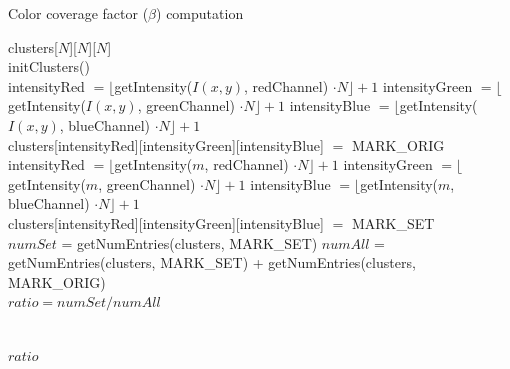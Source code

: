 \begin{algorithm}[bt]
\caption{Color coverage factor ($\beta$) computation}
\label{alg:ccfc}
\begin{algorithmic}[0]

\State clusters[$N$][$N$][$N$]
\\
\State initClusters()
\\
				\State intensityRed $= \lfloor$getIntensity($I(x,y)$, redChannel) $\cdot N\rfloor + 1$
				\State intensityGreen $= \lfloor$getIntensity($I(x,y)$, greenChannel) $\cdot N\rfloor + 1$
				\State intensityBlue $= \lfloor$getIntensity($I(x,y)$, blueChannel) $\cdot N\rfloor + 1$
				\\
				\State clusters[intensityRed][intensityGreen][intensityBlue] $=$ MARK\_ORIG
		\EndFor
\EndFor
\\
\For {$\omega \in \Omega$}
				\State intensityRed $= \lfloor$getIntensity($m$, redChannel) $\cdot N\rfloor + 1$
				\State intensityGreen $= \lfloor$getIntensity($m$, greenChannel) $\cdot N\rfloor + 1$
				\State intensityBlue $= \lfloor$getIntensity($m$, blueChannel) $\cdot N\rfloor + 1$
				\\
				\State clusters[intensityRed][intensityGreen][intensityBlue] $=$ MARK\_SET
		\EndFor
\EndFor
\\
\State $numSet$ = getNumEntries(clusters, MARK\_SET)
\State $numAll$ = getNumEntries(clusters, MARK\_SET) + getNumEntries(clusters, MARK\_ORIG)
\\
\State $ratio = numSet / numAll$

\\

\Return $ratio$

\end{algorithmic}
\end{algorithm}




\clearpage

